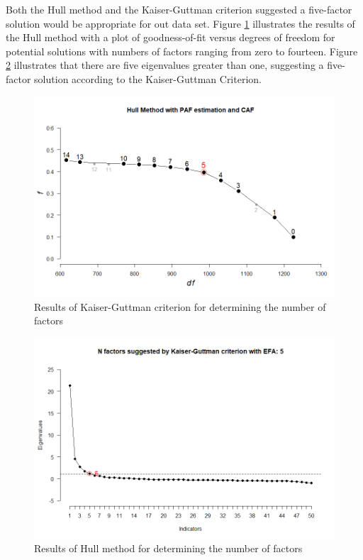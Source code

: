 \documentclass[
]{book}
\begin{document}
Both the Hull method and the Kaiser-Guttman
criterion suggested a five-factor solution would
be appropriate for out data set. Figure \ref{fig:hull-figure} illustrates
the results of the Hull method with a plot of
goodness-of-fit versus degrees of freedom for potential solutions with numbers
of factors ranging from zero to fourteen. Figure \ref{fig:kgc-figure} illustrates that there are
five eigenvalues greater than one, suggesting a
five-factor solution according to the Kaiser-Guttman Criterion.

\begin{figure}
\includegraphics[width=1\linewidth]{04_figures/hull-n-factors} \caption{Results of Kaiser-Guttman criterion for determining the number of factors}\label{fig:hull-figure}
\end{figure}

\begin{figure}
\includegraphics[width=1\linewidth]{04_figures/KGC-n-factors} \caption{Results of Hull method for determining the number of factors}\label{fig:kgc-figure}
\end{figure}
\end{document}
